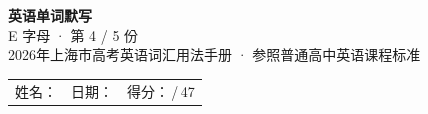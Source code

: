 \documentclass[10pt,a4paper]{article}
\begin{document}
\pagestyle{plain}

\begin{center}
{\LARGE\bfseries 英语单词默写}\\[0.22em]
{\large E 字母 · 第 4 / 5 份}\\[0.18em]
{\small 2026年上海市高考英语词汇用法手册 · 参照普通高中英语课程标准}
\end{center}

\vspace{0.25em}
\noindent\begin{tabular}{@{}p{}@{}p{}@{}p{}@{}}
姓名：\underline{\hspace{2.0cm}} & 日期：\underline{\hspace{2.0cm}} & 得分：\underline{\hspace{1.3cm}}\,/\,47 \\
\end{tabular}

\vspace{0.3em}

\vspace{0.08em}
\end{document}
